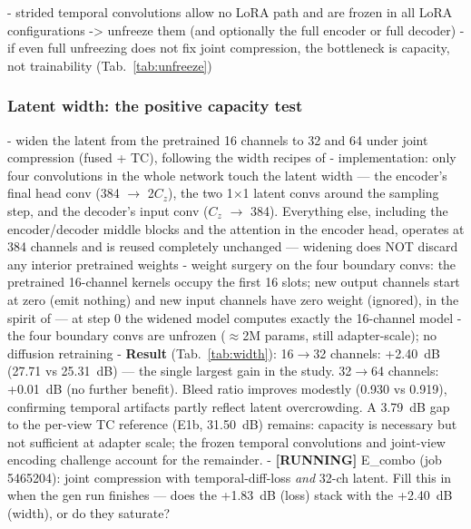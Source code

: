 - strided temporal convolutions allow no LoRA path and are frozen in all LoRA configurations -> unfreeze them (and optionally the full encoder or full decoder)
- if even full unfreezing does not fix joint compression, the bottleneck is capacity, not trainability (Tab.~\ref{tab:unfreeze})

\subsubsection{Latent width: the positive capacity test}

- widen the latent from the pretrained 16 channels to 32 and 64 under joint compression (fused + TC), following the width recipes of \cite{dai2023emu, chen2024deep, hacohen2024ltx}
- implementation: only four convolutions in the whole network touch the latent width --- the encoder's final head conv (384 $\to$ 2$C_z$), the two 1$\times$1 latent convs around the sampling step, and the decoder's input conv ($C_z$ $\to$ 384). Everything else, including the encoder/decoder middle blocks and the attention in the encoder head, operates at 384 channels and is reused completely unchanged --- widening does NOT discard any interior pretrained weights
- weight surgery on the four boundary convs: the pretrained 16-channel kernels occupy the first 16 slots; new output channels start at zero (emit nothing) and new input channels have zero weight (ignored), in the spirit of \cite{zhang2023adding} --- at step 0 the widened model computes exactly the 16-channel model
- the four boundary convs are unfrozen ($\approx$2M params, still adapter-scale); no diffusion retraining
- \textbf{Result} (Tab.~\ref{tab:width}): 16$\to$32 channels: +2.40~dB (27.71 vs 25.31~dB) --- the single largest gain in the study. 32$\to$64 channels: +0.01~dB (no further benefit). Bleed ratio improves modestly (0.930 vs 0.919), confirming temporal artifacts partly reflect latent overcrowding. A 3.79~dB gap to the per-view TC reference (E1b, 31.50~dB) remains: capacity is necessary but not sufficient at adapter scale; the frozen temporal convolutions and joint-view encoding challenge account for the remainder.
- \textbf{[RUNNING]} E\_combo (job 5465204): joint compression with temporal-diff-loss \emph{and} 32-ch latent. Fill this in when the gen run finishes --- does the +1.83~dB (loss) stack with the +2.40~dB (width), or do they saturate?

